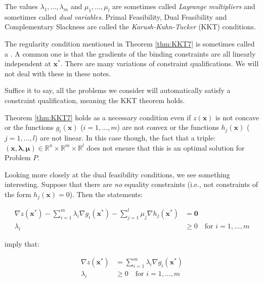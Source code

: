 The values $\lambda_1,\dots,\lambda_m$ and $\mu_1,\dots,\mu_l$ are sometimes called \textit{Lagrange multipliers} and sometimes called \textit{dual variables}. Primal Feasibility, Dual Feasibility and Complementary Slackness are called the \textit{Karush-Kuhn-Tucker} (KKT) conditions.

\begin{remark} The regularity condition mentioned in Theorem \ref{thm:KKT7} is sometimes called a . A common one is that the gradients of the binding constraints are all linearly independent at $\mathbf{x}^*$. There are many variations of constraint qualifications. We will not deal with these in these notes. 
    
    Suffice it to say, all the problems we consider will automatically satisfy a constraint qualification, meaning the KKT theorem holds.
\end{remark}

\begin{remark} Theorem \ref{thm:KKT7} holds as a necessary condition even if $z(\mathbf{x})$ is not concave or the functions $g_i(\mathbf{x})$ ($i=1,\dots,m$) are not convex or the functions $h_j(\mathbf{x})$ ($j=1,\dots,l$) are not linear. In this case though, the fact that a triple: $(\mathbf{x},\boldsymbol{\lambda}, \boldsymbol{\mu}) \in \mathbb{R}^{n} \times \mathbb{R}^m \times \mathbb{R}^l$ does not ensure that this is an optimal solution for Problem $P$.
\end{remark}

Looking more closely at the dual feasibility conditions, we see something interesting. Suppose that there are \textit{no} equality constraints (i.e., not constraints of the form $h_j(\mathbf{x}) = 0$). Then the statements:

\begin{displaymath}
\begin{aligned}
\nabla z(\mathbf{x}^*) - \sum_{i = 1}^m\lambda_i \nabla g_i(\mathbf{x}^*) - \sum_{j = 1}^{l}\mu_j \nabla h_j(\mathbf{x}^*) & = \mathbf{0}\\
\lambda_i &\geq 0 \quad \text{for $i=1,\dots,m$}
\end{aligned}
\end{displaymath}

imply that:

\begin{displaymath}
\begin{aligned}
\nabla z(\mathbf{x}^*) &= \sum_{i = 1}^m\lambda_i \nabla g_i(\mathbf{x}^*)\\
\lambda_i &\geq 0 \quad \text{for $i=1,\dots,m$}
\end{aligned}
\end{displaymath}

